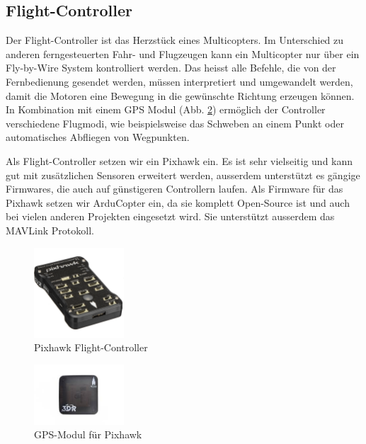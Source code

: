 \subsection{Flight-Controller}

Der Flight-Controller ist das Herzstück eines Multicopters. Im Unterschied zu anderen ferngesteuerten Fahr- und Flugzeugen kann ein Multicopter nur über ein Fly-by-Wire System kontrolliert werden. Das heisst alle Befehle, die von der Fernbedienung gesendet werden, müssen interpretiert und umgewandelt werden, damit die Motoren eine Bewegung in die gewünschte Richtung erzeugen können. In Kombination mit einem GPS Modul (Abb. \ref{fig:gps-module}) ermöglich der Controller verschiedene Flugmodi, wie beispielsweise das Schweben an einem Punkt oder automatisches Abfliegen von Wegpunkten.

Als Flight-Controller setzen wir ein Pixhawk ein. Es ist sehr vielseitig und kann gut mit zusätzlichen Sensoren erweitert werden, ausserdem unterstützt es gängige Firmwares, die auch auf günstigeren Controllern laufen. Als Firmware für das Pixhawk setzen wir ArduCopter ein, da sie komplett Open-Source ist und auch bei vielen anderen Projekten eingesetzt wird. Sie unterstützt ausserdem das \Gls{MAVLink} Protokoll.

\begin{figure}[h]
	\centering
	\includegraphics[width=0.3\textwidth] {images/hardware/pixhawk.jpg} 
	\caption{Pixhawk Flight-Controller}
	\label{fig:pixhawk}
\end{figure}

\begin{figure}[h]
	\centering
	\includegraphics[width=0.3\textwidth] {images/hardware/gps-module.jpg} 
	\caption{GPS-Modul für Pixhawk}
	\label{fig:gps-module}
\end{figure}

